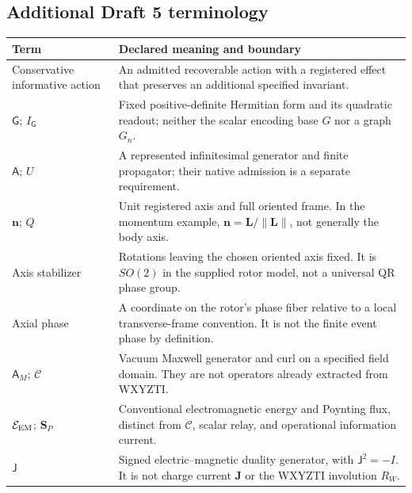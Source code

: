 \subsection*{Additional Draft 5 terminology}
\noindent\begin{tabularx}{\textwidth}{@{}p{}X@{}}
\toprule
Term & Declared meaning and boundary \\
\midrule
Conservative informative action & An admitted recoverable action with a registered effect that preserves an additional specified invariant. \\
$\mathsf G$; $I_{\mathsf G}$ & Fixed positive-definite Hermitian form and its quadratic readout; neither the scalar encoding base $G$ nor a graph $G_n$. \\
$\mathsf A$; $U$ & A represented infinitesimal generator and finite propagator; their native admission is a separate requirement. \\
$\mathbf n$; $Q$ & Unit registered axis and full oriented frame. In the momentum example, $\mathbf n=\mathbf L/\|\mathbf L\|$, not generally the body axis. \\
Axis stabilizer & Rotations leaving the chosen oriented axis fixed. It is $SO(2)$ in the supplied rotor model, not a universal QR phase group. \\
Axial phase & A coordinate on the rotor's phase fiber relative to a local transverse-frame convention. It is not the finite event phase by definition. \\
$\mathsf A_M$; $\mathscr C$ & Vacuum Maxwell generator and curl on a specified field domain. They are not operators already extracted from WXYZTI. \\
$\mathcal E_{\rm EM}$; $\mathbf S_P$ & Conventional electromagnetic energy and Poynting flux, distinct from $\mathcal C$, scalar relay, and operational information current. \\
$\mathsf J$ & Signed electric--magnetic duality generator, with $\mathsf J^2=-I$. It is not charge current $\mathbf J$ or the WXYZTI involution $R_W$. \\
\bottomrule
\end{tabularx}
